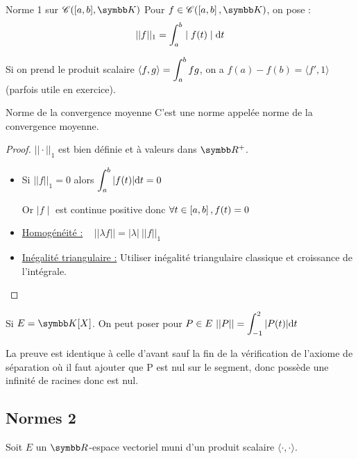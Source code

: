\begin{definition}{Norme 1 sur $\mathscr C([a, b], \K)$}{}
    Pour $f \in \mathscr C(\inter{a}{b}, \K)$, on pose :
    \[||f||_1 = \int_{a }^{b } \mid f(t) \mid \text d t\]
\end{definition}

\begin{remarque}
    Si on prend le produit scalaire $\displaystyle \langle f, g \rangle = \int_{a}^{b} fg$, on a 
    $f(a)-f(b) =  \langle f', 1 \rangle $ (parfois utile en exercice). 
\end{remarque}

\begin{theoreme}{Norme de la convergence moyenne}{}
    C'est une norme appelée norme de la convergence moyenne. 
\end{theoreme}

\begin{proof}
    $||\cdot ||_1$ est bien définie et à valeurs dans $\R^+$.
    
    \begin{itemize}
        \item Si $||f||_1 = 0$ alors $\displaystyle \int_{a }^{b } |f(t)| \text d t = 0$

        Or $\mid f \mid $ est continue positive donc $\forall t \in \left[a, b\right], f(t) = 0$

        \item \uline{Homogénéité :} ~ $|| \lambda f || = |\lambda| ~ ||f||_1$ 

        \item \uline{Inégalité triangulaire :} Utiliser inégalité triangulaire classique et croissance de l'intégrale.     
    \end{itemize}
\end{proof}

\begin{exemple}
    Si $E = \K[X]$.
    On peut poser pour $\displaystyle P \in E~||P|| = \int_{-1}^{2} |P(t)| \text d t$

    La preuve est identique à celle d'avant sauf la fin de la vérification de l'axiome de séparation 
    où il faut ajouter que P est nul sur le segment, donc possède une infinité de racines donc est nul. 
\end{exemple}

\subsection{Normes 2}

Soit $E$ un $\R$-espace vectoriel muni d'un produit scalaire $\langle \cdot , \cdot \rangle$.

